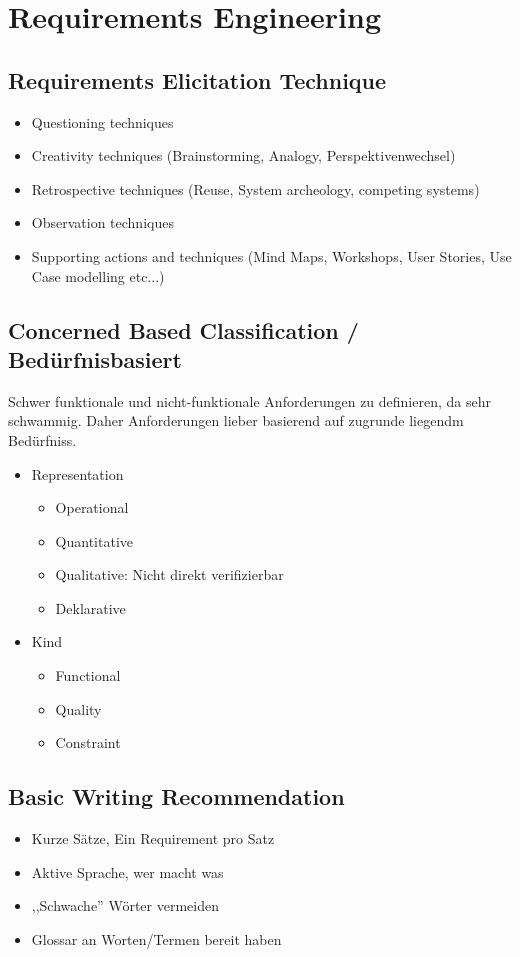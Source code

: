 \chapter{Requirements Engineering}


\section{Requirements Elicitation Technique}
\begin{itemize}
    \item Questioning techniques
    \item Creativity techniques (Brainstorming, Analogy, Perspektivenwechsel)
    \item Retrospective techniques (Reuse, System archeology, competing systems)
    \item Observation techniques
    \item Supporting actions and techniques (Mind Maps, Workshops, User Stories,
    Use Case modelling etc...)
\end{itemize}

\section{Concerned Based Classification / Bedürfnisbasiert}
Schwer funktionale und nicht-funktionale Anforderungen zu definieren, da sehr
schwammig. Daher Anforderungen lieber basierend auf zugrunde liegendm Bedürfniss.
\begin{itemize}
    \item Representation
    \begin{itemize}
        \item Operational
        \item Quantitative
        \item Qualitative: Nicht direkt verifizierbar
        \item Deklarative
    \end{itemize}
    \item Kind
    \begin{itemize}
        \item Functional
        \item Quality
        \item Constraint
    \end{itemize}
\end{itemize}


\section{Basic Writing Recommendation}
\begin{itemize}
    \item Kurze Sätze, Ein Requirement pro Satz
    \item Aktive Sprache, wer macht was
    \item ,,Schwache'' Wörter vermeiden
    \item Glossar an Worten/Termen bereit haben
\end{itemize}

